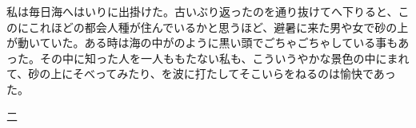 \documentclass[a4j,onecolumn]{tarticle}
\begin{document}
私は毎日海へはいりに出掛けた。古いぶり返ったのを通り抜けてへ下りると、このにこれほどの都会人種が住んでいるかと思うほど、避暑に来た男や女で砂の上が動いていた。ある時は海の中がのように黒い頭でごちゃごちゃしている事もあった。その中に知った人を一人ももたない私も、こういうやかな景色の中にまれて、砂の上にそべってみたり、を波に打たしてそこいらをねるのは愉快であった。


二


\end{document}
